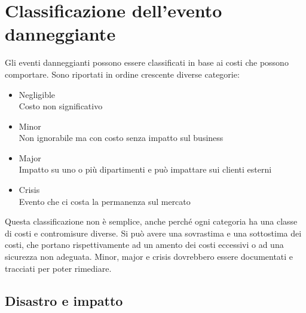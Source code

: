\section{Classificazione dell'evento danneggiante}

Gli eventi danneggianti possono essere classificati in base ai costi
che possono comportare. Sono riportati in ordine crescente diverse categorie:

\begin{itemize}
\item Negligible \\
Costo non significativo
\item Minor \\
Non ignorabile ma con costo senza impatto sul business
\item Major \\
Impatto su uno o più dipartimenti e può impattare sui clienti esterni
\item Crisis \\
Evento che ci costa la permanenza sul mercato
\end{itemize}

Questa classificazione non è semplice, anche perché ogni categoria ha una
classe di costi e contromisure diverse. Si può avere una sovrastima e una
sottostima dei costi, che portano rispettivamente ad un amento dei costi
eccessivi o ad una sicurezza non adeguata.
Minor, major e crisis dovrebbero essere documentati e tracciati per poter
rimediare.

\subsection{Disastro e impatto}

